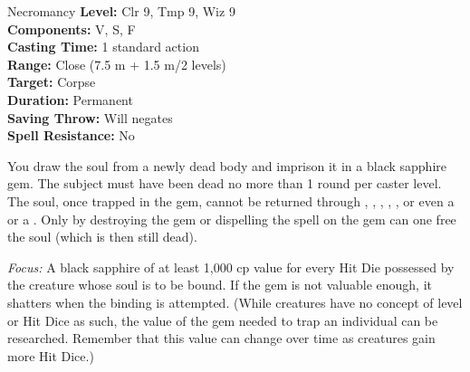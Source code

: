 {Necromancy}
{
	\textbf{Level:}
	Clr 9, Tmp 9, Wiz 9\\
	\textbf{Components:}
	V, S, F\\
	\textbf{Casting Time:}
	1 standard action\\
	\textbf{Range:}
	Close (7.5 m + 1.5 m/2 levels)\\
	\textbf{Target:}
	Corpse\\
	\textbf{Duration:}
	Permanent\\
	\textbf{Saving Throw:}
	Will negates\\
	\textbf{Spell Resistance:}
	No\\
}
{
	You draw the soul from a newly dead body and imprison it in a black sapphire gem. The subject must have been dead no more than 1 round per caster level. The soul, once trapped in the gem, cannot be returned through , , , , , or even a  or a . Only by destroying the gem or dispelling the spell on the gem can one free the soul (which is then still dead).

	\textit{Focus:}
	A black sapphire of at least 1,000 cp value for every Hit Die possessed by the creature whose soul is to be bound. If the gem is not valuable enough, it shatters when the binding is attempted. (While creatures have no concept of level or Hit Dice as such, the value of the gem needed to trap an individual can be researched. Remember that this value can change over time as creatures gain more Hit Dice.)

}
